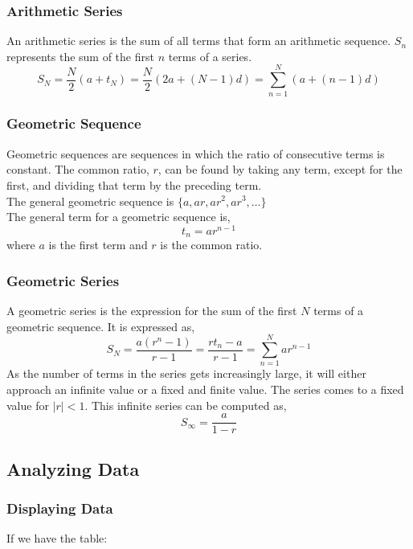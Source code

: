 \documentclass[11pt, fleqn]{article}
\begin{document}
\subsubsection{Arithmetic Series}
An arithmetic series is the sum of all terms that form an arithmetic sequence. $S_n$ represents the sum of the first $n$ terms of a series.
$$S_N=\frac{N}{2}(a+t_N)=\frac{N}{2}(2a+(N-1)d)=\sum \limits_{n=1}^N (a+(n-1)d)$$

\subsubsection{Geometric Sequence}
Geometric sequences are sequences in which the ratio of consecutive terms is constant. The common ratio, $r$, can be found by taking any term, except for the first, and dividing that term by the preceding term.\\
The general geometric sequence is $\{a,ar,ar^2,ar^3,\ldots\}$\\
The general term for a geometric sequence is,
$$t_n=ar^{n-1}$$
where $a$ is the first term and $r$ is the common ratio.

\subsubsection{Geometric Series}
A geometric series is the expression for the sum of the first $N$ terms of a geometric sequence. It is expressed as,
$$S_N=\frac{a(r^n-1)}{r-1}=\frac{rt_n-a}{r-1}=\sum \limits_{n=1}^N ar^{n-1}$$
As the number of terms in the series gets increasingly large, it will either approach an infinite value or a fixed and finite value. The series comes to a fixed value for $|r|<1$. This infinite series can be computed as,
$$S_\infty=\frac{a}{1-r}$$








\subsection{Analyzing Data}
\subsubsection{Displaying Data}
If we have the table:\\
\end{document}
